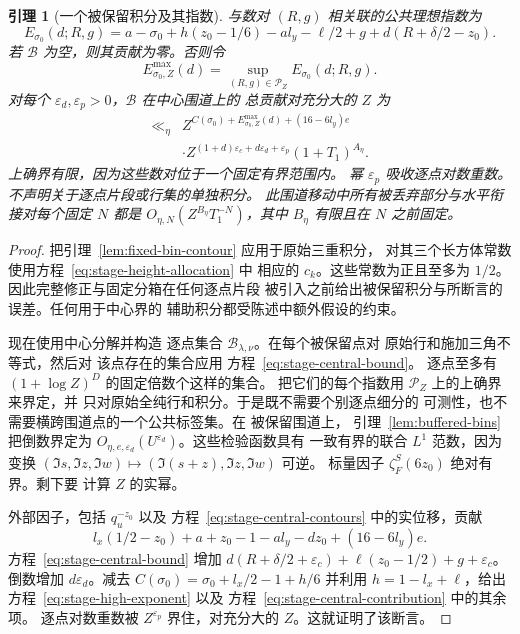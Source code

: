 \documentclass[11pt,a4paper]{article}
\numberwithin{equation}{section}
\numberwithin{figure}{section}
\newtheorem{lemma}[theorem]{引理}
\theoremstyle{definition}
\theoremstyle{remark}
\begin{document}
\begin{lemma}[一个被保留积分及其指数]
与数对 $(R,g)$ 相关联的公共理想指数为
\begin{equation}
 E_{\sigma_0}(d;R,g)=a-\sigma_0+h(z_0-1/6)-a l_y-\ell/2+g
                  +d(R+\delta/2-z_0).
 \label{eq:stage-high-exponent}
\end{equation}
若 $\mathcal B$ 为空，则其贡献为零。否则令
\[
 E^{\max}_{\sigma_0,Z}(d)
   =\sup_{(R,g)\in\mathcal P_Z}E_{\sigma_0}(d;R,g).
\]
对每个 $\varepsilon_d,\varepsilon_p>0$，$\mathcal B$ 在中心围道上的
总贡献对充分大的 $Z$ 为
\begin{equation}
 \begin{split}
 \ll_\eta{}& Z^{C(\sigma_0)+E^{\max}_{\sigma_0,Z}(d)+(16-6l_y)e}\\
 &\cdot Z^{(1+d)\varepsilon_c+d\varepsilon_d+\varepsilon_p}
       (1+T_1)^{A_\eta}.
 \end{split}
 \label{eq:stage-central-contribution}
\end{equation}
上确界有限，因为这些数对位于一个固定有界范围内。
幂 $\varepsilon_p$ 吸收逐点对数重数。
不声明关于逐点片段或行集的单独积分。
此围道移动中所有被丢弃部分与水平衔接对每个固定 $N$ 都是
$O_{\eta,N}(Z^{B_\eta}T_1^{-N})$，其中 $B_\eta$
有限且在 $N$ 之前固定。
\end{lemma}

\begin{proof}
把引理~\ref{lem:fixed-bin-contour} 应用于原始三重积分，
对其三个长方体常数使用方程~\eqref{eq:stage-height-allocation} 中
相应的 $c_k$。这些常数为正且至多为 $1/2$。
因此完整修正与固定分箱在任何逐点片段
被引入之前给出被保留积分与所断言的误差。任何用于中心界的
辅助积分都受陈述中额外假设的约束。

现在使用中心分解并构造
逐点集合 $\mathcal B_{\lambda,\nu}$。在每个被保留点对
原始行和施加三角不等式，然后对
该点存在的集合应用
方程~\eqref{eq:stage-central-bound}。
逐点至多有 $(1+\log Z)^D$ 的固定倍数个这样的集合。
把它们的每个指数用 $\mathcal P_Z$ 上的上确界来界定，并
只对原始全纯行和积分。于是既不需要个别逐点细分的
可测性，也不需要横跨围道点的一个公共标签集。在
被保留围道上，
引理~\ref{lem:buffered-bins} 把倒数界定为
$O_{\eta,e,\varepsilon_d}(U^{\varepsilon_d})$。这些检验函数具有
一致有界的联合 $L^1$ 范数，因为变换
$(\Im s,\Im z,\Im w)\mapsto(\Im(s+z),\Im z,\Im w)$ 可逆。
标量因子 $\zeta_F^S(6z_0)$ 绝对有界。剩下要
计算 $Z$ 的实幂。

外部因子，包括 $q_u^{-z_0}$ 以及
方程~\eqref{eq:stage-central-contours} 中的实位移，贡献
\[
 l_x(1/2-z_0)+a+z_0-1-a l_y-dz_0+(16-6l_y)e.
\]
方程~\eqref{eq:stage-central-bound} 增加
$d(R+\delta/2+\varepsilon_c)+\ell(z_0-1/2)+g+\varepsilon_c$。
倒数增加 $d\varepsilon_d$。减去
$C(\sigma_0)=\sigma_0+l_x/2-1+h/6$ 并利用
$h=1-l_x+\ell$，给出方程~\eqref{eq:stage-high-exponent} 以及
方程~\eqref{eq:stage-central-contribution} 中的其余项。
逐点对数重数被 $Z^{\varepsilon_p}$ 界住，对充分大的 $Z$。这就证明了该断言。
\end{proof}
\end{document}
